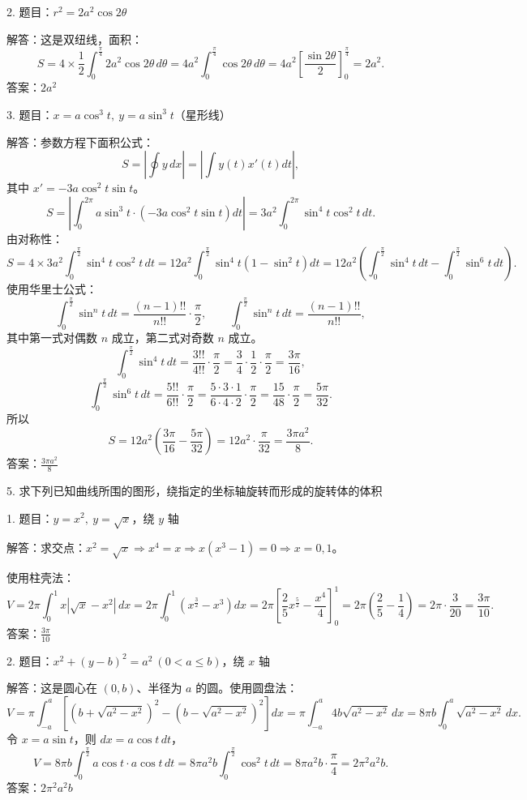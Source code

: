 2. 题目：\(r^{2}=2a^{2}\cos2\theta\)

解答：这是双纽线，面积：
\[ S=4\times\frac{1}{2}\int_{0}^{\frac{\pi}{4}}2a^{2}\cos2\theta\,d\theta=4a^{2}\int_{0}^{\frac{\pi}{4}}\cos2\theta\,d\theta=4a^{2}\left[\frac{\sin2\theta}{2}\right]_{0}^{\frac{\pi}{4}}=2a^{2}. \]
答案：\(2a^{2}\)

3. 题目：\(x=a\cos^{3}t,\ y=a\sin^{3}t\)（星形线）

解答：参数方程下面积公式：
\[ S=\left|\oint y\,dx\right|=\left|\int y(t)x'(t)dt\right|, \]
其中 \(x'=-3a\cos^{2}t\sin t\)。
\[ S=\left|\int_{0}^{2\pi}a\sin^{3}t\cdot(-3a\cos^{2}t\sin t)dt\right|=3a^{2}\int_{0}^{2\pi}\sin^{4}t\cos^{2}t\,dt. \]
由对称性：
\[ S=4\times3a^{2}\int_{0}^{\frac{\pi}{2}}\sin^{4}t\cos^{2}t\,dt=12a^{2}\int_{0}^{\frac{\pi}{2}}\sin^{4}t(1-\sin^{2}t)dt=12a^{2}\left(\int_{0}^{\frac{\pi}{2}}\sin^{4}t\,dt-\int_{0}^{\frac{\pi}{2}}\sin^{6}t\,dt\right). \]
使用华里士公式：
\[ \int_{0}^{\frac{\pi}{2}}\sin^{n}t\,dt=\frac{(n-1)!!}{n!!}\cdot\frac{\pi}{2},\qquad \int_{0}^{\frac{\pi}{2}}\sin^{n}t\,dt=\frac{(n-1)!!}{n!!}, \]
其中第一式对偶数 \(n\) 成立，第二式对奇数 \(n\) 成立。
\[ \int_{0}^{\frac{\pi}{2}}\sin^{4}t\,dt=\frac{3!!}{4!!}\cdot\frac{\pi}{2}=\frac{3}{4}\cdot\frac{1}{2}\cdot\frac{\pi}{2}=\frac{3\pi}{16}, \]
\[ \int_{0}^{\frac{\pi}{2}}\sin^{6}t\,dt=\frac{5!!}{6!!}\cdot\frac{\pi}{2}=\frac{5\cdot3\cdot1}{6\cdot4\cdot2}\cdot\frac{\pi}{2}=\frac{15}{48}\cdot\frac{\pi}{2}=\frac{5\pi}{32}. \]
所以
\[ S=12a^{2}\left(\frac{3\pi}{16}-\frac{5\pi}{32}\right)=12a^{2}\cdot\frac{\pi}{32}=\frac{3\pi a^{2}}{8}. \]
答案：\(\frac{3\pi a^{2}}{8}\)

5. 求下列已知曲线所围的图形，绕指定的坐标轴旋转而形成的旋转体的体积

1. 题目：\(y=x^{2},\ y=\sqrt{x}\)，绕 \(y\) 轴

解答：求交点：\(x^{2}=\sqrt{x}\Rightarrow x^{4}=x\Rightarrow x(x^{3}-1)=0\Rightarrow x=0,1\)。

使用柱壳法：
\[ V=2\pi\int_{0}^{1}x|\sqrt{x}-x^{2}|\,dx=2\pi\int_{0}^{1}(x^{\frac{3}{2}}-x^{3})dx=2\pi\left[\frac{2}{5}x^{\frac{5}{2}}-\frac{x^{4}}{4}\right]_{0}^{1}=2\pi\left(\frac{2}{5}-\frac{1}{4}\right)=2\pi\cdot\frac{3}{20}=\frac{3\pi}{10}. \]
答案：\(\frac{3\pi}{10}\)

2. 题目：\(x^{2}+(y-b)^{2}=a^{2}\ (0<a\le b)\)，绕 \(x\) 轴

解答：这是圆心在 \((0,b)\)、半径为 \(a\) 的圆。使用圆盘法：
\[ V=\pi\int_{-a}^{a}\left[\left(b+\sqrt{a^{2}-x^{2}}\right)^{2}-\left(b-\sqrt{a^{2}-x^{2}}\right)^{2}\right]dx=\pi\int_{-a}^{a}4b\sqrt{a^{2}-x^{2}}\,dx=8\pi b\int_{0}^{a}\sqrt{a^{2}-x^{2}}\,dx. \]
令 \(x=a\sin t\)，则 \(dx=a\cos t\,dt\)，
\[ V=8\pi b\int_{0}^{\frac{\pi}{2}}a\cos t\cdot a\cos t\,dt=8\pi a^{2}b\int_{0}^{\frac{\pi}{2}}\cos^{2}t\,dt=8\pi a^{2}b\cdot\frac{\pi}{4}=2\pi^{2}a^{2}b. \]
答案：\(2\pi^{2}a^{2}b\)

